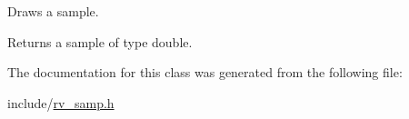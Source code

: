 Draws a sample. 

\begin{DoxyReturn}{Returns}
a sample of type double. 
\end{DoxyReturn}


The documentation for this class was generated from the following file\+:\begin{DoxyCompactItemize}
\item 
include/\hyperlink{rv__samp_8h}{rv\+\_\+samp.\+h}\end{DoxyCompactItemize}
